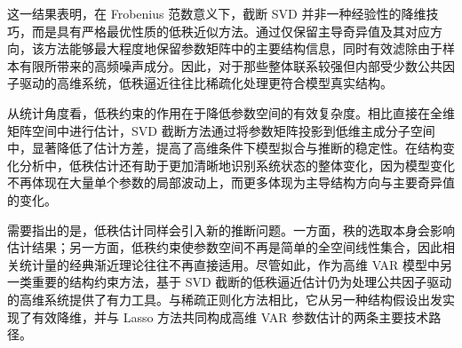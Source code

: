 这一结果表明，在 Frobenius 范数意义下，截断 SVD 并非一种经验性的降维技巧，而是具有严格最优性质的低秩近似方法。通过仅保留主导奇异值及其对应方向，该方法能够最大程度地保留参数矩阵中的主要结构信息，同时有效滤除由于样本有限所带来的高频噪声成分。因此，对于那些整体联系较强但内部受少数公共因子驱动的高维系统，低秩逼近往往比稀疏化处理更符合模型真实结构。

从统计角度看，低秩约束的作用在于降低参数空间的有效复杂度。相比直接在全维矩阵空间中进行估计，SVD 截断方法通过将参数矩阵投影到低维主成分子空间中，显著降低了估计方差，提高了高维条件下模型拟合与推断的稳定性。在结构变化分析中，低秩估计还有助于更加清晰地识别系统状态的整体变化，因为模型变化不再体现在大量单个参数的局部波动上，而更多体现为主导结构方向与主要奇异值的变化。

需要指出的是，低秩估计同样会引入新的推断问题。一方面，秩的选取本身会影响估计结果；另一方面，低秩约束使参数空间不再是简单的全空间线性集合，因此相关统计量的经典渐近理论往往不再直接适用。尽管如此，作为高维 VAR 模型中另一类重要的结构约束方法，基于 SVD 截断的低秩逼近估计仍为处理公共因子驱动的高维系统提供了有力工具。与稀疏正则化方法相比，它从另一种结构假设出发实现了有效降维，并与 Lasso 方法共同构成高维 VAR 参数估计的两条主要技术路径。

